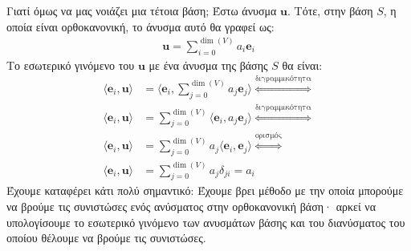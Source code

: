 \documentclass[main.tex]{subfiles}
\begin{document}
	Γιατί όμως να μας νοιάζει μια τέτοια βάση; Έστω άνυσμα $\boldsymbol{u}$. Τότε, στην βάση $S$, η οποία είναι ορθοκανονική, το άνυσμα αυτό θα γραφεί ως:
	\begin{align*}
		\boldsymbol{u} = \sum_{i=0}^{\dim(V)}a_i\boldsymbol{e}_i
	\end{align*}
	Το εσωτερικό γινόμενο του $\boldsymbol{u}$ με ένα άνυσμα της βάσης $S$ θα είναι:
	\begin{align*}
		\langle\boldsymbol{e}_i,\boldsymbol{u}\rangle &= \langle\boldsymbol{e}_i,\sum_{j=0}^{\dim(V)}a_j\boldsymbol{e}_j\rangle  \overset{\text{διγραμμικότητα}}{\Leftrightarrow}\\
		\langle\boldsymbol{e}_i,\boldsymbol{u}\rangle &= \sum_{j=0}^{\dim(V)}\langle\boldsymbol{e}_i,a_j\boldsymbol{e}_j\rangle \overset{\text{διγραμμικότητα}}{\Leftrightarrow}\\
		\langle\boldsymbol{e}_i,\boldsymbol{u}\rangle &= \sum_{j=0}^{\dim(V)}a_j\langle\boldsymbol{e}_i,\boldsymbol{e}_j\rangle \overset{\text{ορισμός}}{\Leftrightarrow}\\
		\langle\boldsymbol{e}_i,\boldsymbol{u}\rangle &= \sum_{j=0}^{\dim(V)}a_j\delta_{ji} = a_i
	\end{align*}
	Έχουμε καταφέρει κάτι πολύ σημαντικό: Έχουμε βρει μέθοδο με την οποία μπορούμε να βρούμε τις συνιστώσες ενός ανύσματος στην ορθοκανονική βάση· αρκεί να υπολογίσουμε το εσωτερικό γινόμενο των ανυσμάτων βάσης και του διανύσματος του οποίου θέλουμε να βρούμε τις συνιστώσες.
	
\end{document}
